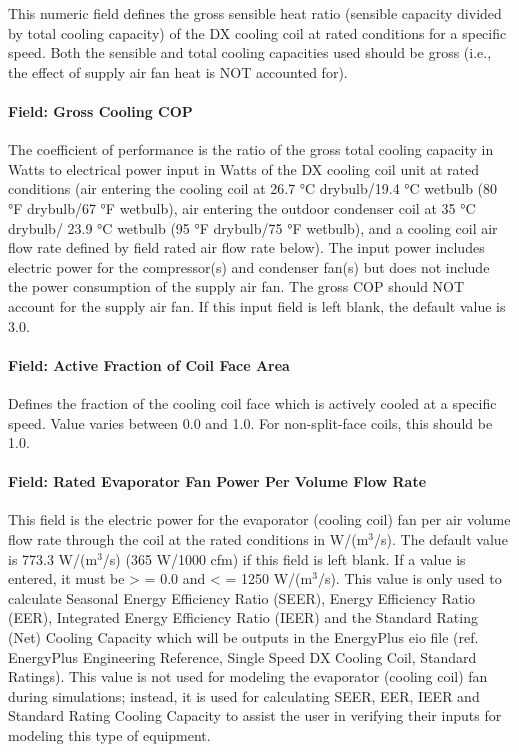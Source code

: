 This numeric field defines the gross sensible heat ratio (sensible capacity divided by total cooling capacity) of the DX cooling coil at rated conditions for a specific speed. Both the sensible and total cooling capacities used should be gross (i.e., the effect of supply air fan heat is NOT accounted for).

\paragraph{Field: Gross Cooling COP}\label{field-gross-rated-cooling-cop}

The coefficient of performance is the ratio of the gross total cooling capacity in Watts to electrical power input in Watts of the DX cooling coil unit at rated conditions (air entering the cooling coil at 26.7 °C drybulb/19.4 °C wetbulb (80 °F drybulb/67 °F wetbulb), air entering the outdoor condenser coil at 35 °C drybulb/ 23.9 °C wetbulb (95 °F drybulb/75 °F wetbulb), and a cooling coil air flow rate defined by field rated air flow rate below). The input power includes electric power for the compressor(s) and condenser fan(s) but does not include the power consumption of the supply air fan. The gross COP should NOT account for the supply air fan. If this input field is left blank, the default value is 3.0.

\paragraph{Field: Active Fraction of Coil Face Area}\label{field-active-fraction-of-coil-face-area}

Defines the fraction of the cooling coil face which is actively cooled at a specific speed. Value varies between 0.0 and 1.0. For non-split-face coils, this should be 1.0.

\paragraph{Field: Rated Evaporator Fan Power Per Volume Flow Rate}\label{field-rated-evaporator-fan-power-per-volume-flow-rate}

This field is the electric power for the evaporator (cooling coil) fan per air volume flow rate through the coil at the rated conditions in W/(m\(^{3}\)/s). The default value is 773.3 W/(m\(^{3}\)/s) (365 W/1000 cfm) if this field is left blank. If a value is entered, it must be \textgreater{} = 0.0 and \textless{} = 1250 W/(m\(^{3}\)/s). This value is only used to calculate Seasonal Energy Efficiency Ratio (SEER), Energy Efficiency Ratio (EER), Integrated Energy Efficiency Ratio (IEER) and the Standard Rating (Net) Cooling Capacity which will be outputs in the EnergyPlus eio file (ref. EnergyPlus Engineering Reference, Single Speed DX Cooling Coil, Standard Ratings). This value is not used for modeling the evaporator (cooling coil) fan during simulations; instead, it is used for calculating SEER, EER, IEER and Standard Rating Cooling Capacity to assist the user in verifying their inputs for modeling this type of equipment.

